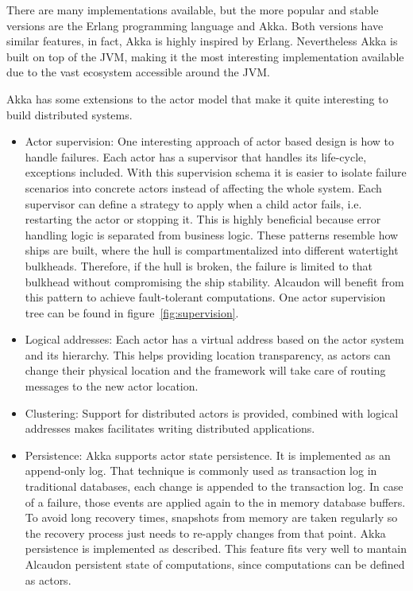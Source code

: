 There are many implementations available\cite{wikiactor}, but the more popular
and stable versions are the Erlang programming language and Akka. Both versions
have similar features, in fact, Akka is highly inspired by Erlang. Nevertheless
Akka is built on top of the JVM, making it the most interesting implementation
available due to the vast ecosystem accessible around the JVM.

Akka has some extensions to the actor model that make it quite interesting to
build distributed systems.
\begin{itemize}
\item Actor supervision: One interesting approach of actor based design is how
  to handle failures. Each actor has a supervisor that handles its life-cycle,
  exceptions included. With this supervision schema it is easier to isolate failure
  scenarios into concrete actors instead of affecting the whole system. Each
  supervisor can define a strategy to apply when a child actor fails, i.e.
  restarting the actor or stopping it. This is highly beneficial because error
  handling logic is separated from business logic. These patterns resemble how
  ships are built, where the hull is compartmentalized into different watertight
  bulkheads. Therefore, if the hull is broken, the failure is limited to that
  bulkhead without compromising the ship stability. Alcaudon will benefit from
  this pattern to achieve fault-tolerant computations. One actor supervision
  tree can be found in figure~\ref{fig:supervision}.
\item Logical addresses: Each actor has a virtual address based on the actor
  system and its hierarchy. This helps providing location transparency, as
  actors can change their physical location and the framework will take care of
  routing messages to the new actor location.
\item Clustering: Support for distributed actors is provided, combined with
  logical addresses makes facilitates writing distributed applications.
\item Persistence: Akka supports actor state persistence. It is implemented as
  an append-only log. That technique is commonly used as transaction log in
  traditional databases, each change is appended to the transaction log. In case
  of a failure, those events are applied again to the in memory database
  buffers. To avoid long recovery times, snapshots from memory are taken
  regularly so the recovery process just needs to re-apply changes from that
  point. Akka persistence is implemented as described. This feature fits very
  well to mantain Alcaudon persistent state of computations, since computations
  can be defined as actors.
\end{itemize}


